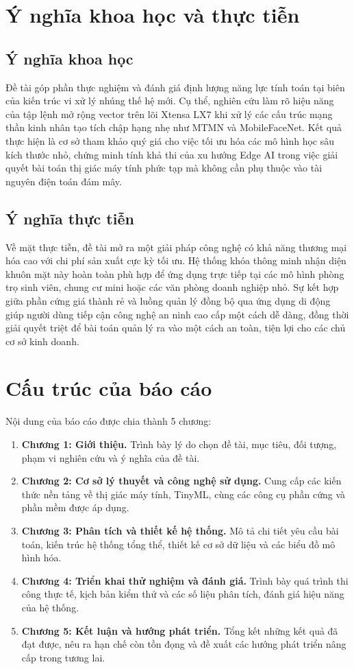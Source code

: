 \section{Ý nghĩa khoa học và thực tiễn}

\subsection{Ý nghĩa khoa học}
Đề tài góp phần thực nghiệm và đánh giá định lượng năng lực tính toán tại biên của kiến trúc vi xử lý nhúng thế hệ mới. Cụ thể, nghiên cứu làm rõ hiệu năng của tập lệnh mở rộng vector trên lõi Xtensa LX7 khi xử lý các cấu trúc mạng thần kinh nhân tạo tích chập hạng nhẹ như MTMN và MobileFaceNet. Kết quả thực hiện là cơ sở tham khảo quý giá cho việc tối ưu hóa các mô hình học sâu kích thước nhỏ, chứng minh tính khả thi của xu hướng Edge AI trong việc giải quyết bài toán thị giác máy tính phức tạp mà không cần phụ thuộc vào tài nguyên điện toán đám mây.

\subsection{Ý nghĩa thực tiễn}
Về mặt thực tiễn, đề tài mở ra một giải pháp công nghệ có khả năng thương mại hóa cao với chi phí sản xuất cực kỳ tối ưu. Hệ thống khóa thông minh nhận diện khuôn mặt này hoàn toàn phù hợp để ứng dụng trực tiếp tại các mô hình phòng trọ sinh viên, chung cư mini hoặc các văn phòng doanh nghiệp nhỏ. Sự kết hợp giữa phần cứng giá thành rẻ và luồng quản lý đồng bộ qua ứng dụng di động giúp người dùng tiếp cận công nghệ an ninh cao cấp một cách dễ dàng, đồng thời giải quyết triệt để bài toán quản lý ra vào một cách an toàn, tiện lợi cho các chủ cơ sở kinh doanh.

\section{Cấu trúc của báo cáo}
Nội dung của báo cáo được chia thành 5 chương:
\begin{enumerate}
    \item \textbf{Chương 1: Giới thiệu.} Trình bày lý do chọn đề tài, mục tiêu, đối tượng, phạm vi nghiên cứu và ý nghĩa của đề tài.
    \item \textbf{Chương 2: Cơ sở lý thuyết và công nghệ sử dụng.} Cung cấp các kiến thức nền tảng về thị giác máy tính, TinyML, cùng các công cụ phần cứng và phần mềm được áp dụng.
    \item \textbf{Chương 3: Phân tích và thiết kế hệ thống.} Mô tả chi tiết yêu cầu bài toán, kiến trúc hệ thống tổng thể, thiết kế cơ sở dữ liệu và các biểu đồ mô hình hóa.
    \item \textbf{Chương 4: Triển khai thử nghiệm và đánh giá.} Trình bày quá trình thi công thực tế, kịch bản kiểm thử và các số liệu phân tích, đánh giá hiệu năng của hệ thống.
    \item \textbf{Chương 5: Kết luận và hướng phát triển.} Tổng kết những kết quả đã đạt được, nêu ra hạn chế còn tồn đọng và đề xuất các hướng phát triển nâng cấp trong tương lai.
\end{enumerate}